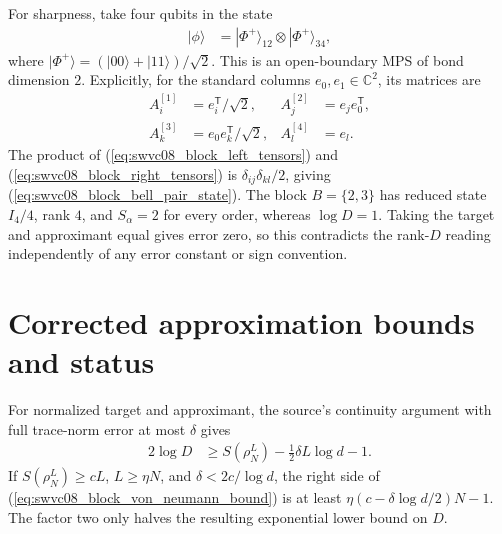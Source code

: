 \documentclass{article}
\begin{document}
For sharpness, take four qubits in the state
\begin{align}
    |\phi\rangle & =|\Phi^+\rangle_{12}\otimes|\Phi^+\rangle_{34},
    \label{eq:swvc08_block_bell_pair_state}
\end{align}
where $|\Phi^+\rangle=(|00\rangle+|11\rangle)/\sqrt2$.
This is an open-boundary MPS of bond dimension $2$. Explicitly, for the
standard columns $e_0,e_1\in\mathbb C^2$, its matrices are
\begin{align}
    A^{[1]}_i & =e_i^{\mathsf T}/\sqrt2,    &
    A^{[2]}_j & =e_je_0^{\mathsf T},
    \label{eq:swvc08_block_left_tensors}      \\
    A^{[3]}_k & =e_0e_k^{\mathsf T}/\sqrt2, &
    A^{[4]}_l & =e_l.
    \label{eq:swvc08_block_right_tensors}
\end{align}
The product of (\ref{eq:swvc08_block_left_tensors}) and
(\ref{eq:swvc08_block_right_tensors}) is $\delta_{ij}\delta_{kl}/2$,
giving (\ref{eq:swvc08_block_bell_pair_state}). The block $B=\{2,3\}$ has
reduced state $I_4/4$, rank $4$, and $S_\alpha=2$ for every order, whereas
$\log D=1$. Taking the target and approximant equal gives error zero, so
this contradicts the rank-$D$ reading independently of any error constant
or sign convention.

\newpage
\section{Corrected approximation bounds and status}

For normalized target and approximant, the source's continuity argument
with full trace-norm error at most $\delta$ gives
\begin{align}
    2\log D & \ge S(\rho_N^L)-\tfrac12\delta L\log d-1.
    \label{eq:swvc08_block_von_neumann_bound}
\end{align}
If $S(\rho_N^L)\ge cL$, $L\ge\eta N$, and $\delta<2c/\log d$, the right
side of (\ref{eq:swvc08_block_von_neumann_bound}) is at least
$\eta(c-\delta\log d/2)N-1$. The factor two only halves
the resulting exponential lower bound on $D$.
\end{document}
